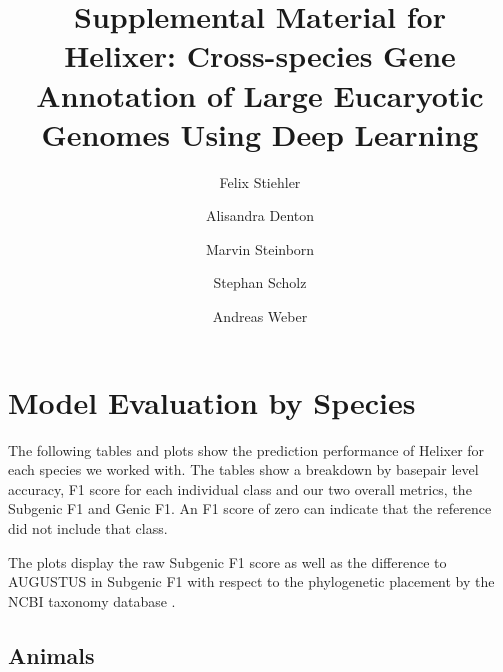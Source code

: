 \documentclass{article}
\begin{document}
\title{Supplemental Material for \\ Helixer: Cross-species Gene Annotation of Large Eucaryotic Genomes Using Deep Learning}

\author[1]{Felix Stiehler}
\author[1]{Alisandra Denton}
\author[1]{Marvin Steinborn}
\author[ \hspace{-1ex}]{Stephan Scholz}
\author[1]{Andreas Weber}


\date{}
\maketitle
\tableofcontents

\newpage
\section{Model Evaluation by Species}
The following tables and plots show the prediction performance of Helixer for each species we worked with. The tables show a breakdown by basepair level accuracy, F1 score for each individual class and our two overall metrics, the Subgenic F1 and Genic F1. An F1 score of zero can indicate that the reference did not include that class. 

The plots display the raw Subgenic F1 score as well as the difference to AUGUSTUS in Subgenic F1 with respect to the phylogenetic placement by the NCBI taxonomy database \citep{federhen2012ncbi}.

\subsection{Animals}
\newpage
\end{document}
